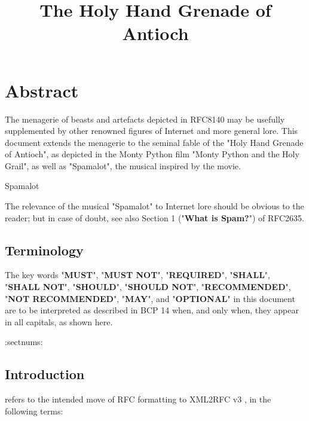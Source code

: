 \documentclass{metanorma}
\title{The Holy Hand Grenade of Antioch}
\begin{document}
\maketitle

\tableofcontents


\section{Abstract}

The menagerie of beasts and artefacts depicted in RFC8140
may be usefully supplemented by other renowned figures of
Internet and more general lore. This document extends the
menagerie to the seminal fable of the
"Holy Hand Grenade of Antioch", as depicted in the
Monty Python film "Monty Python and the Holy Grail",
as well as "Spamalot", the musical inspired by the movie.

\begin{note}
  \caption{Spamalot}
  The relevance of the musical "Spamalot" to Internet lore should be
  obvious to the reader; but in case of doubt, see also
  Section 1 ("\textbf{What is Spam?}") of RFC2635.
\end{note}



\subsection{Terminology}

The key words "\textbf{MUST}", "\textbf{MUST NOT}", "\textbf{REQUIRED}", "\textbf{SHALL}",
"\textbf{SHALL NOT}", "\textbf{SHOULD}", "\textbf{SHOULD NOT}", "\textbf{RECOMMENDED}",
"\textbf{NOT RECOMMENDED}", "\textbf{MAY}", and "\textbf{OPTIONAL}" in this document
are to be interpreted as described in BCP 14  
when, and only when, they appear in all capitals, as shown here.

:sectnums:
\subsection{Introduction}

 refers to the intended move of RFC formatting to
XML2RFC v3 , in the following terms:
\end{document}
